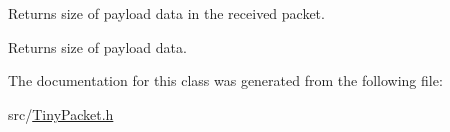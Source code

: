 Returns size of payload data in the received packet. \begin{DoxyReturn}{Returns}
size of payload data. 
\end{DoxyReturn}


The documentation for this class was generated from the following file\+:\begin{DoxyCompactItemize}
\item 
src/\hyperlink{TinyPacket_8h}{Tiny\+Packet.\+h}\end{DoxyCompactItemize}
